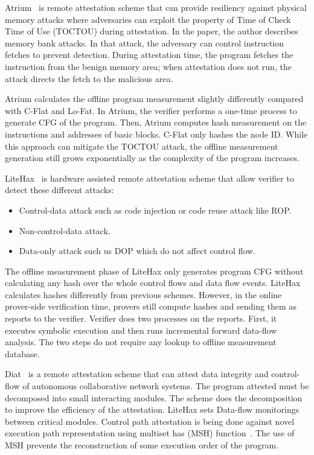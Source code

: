 Atrium~\cite{zeitouniATRIUMRuntimeAttestation2017} is remote attestation scheme
that can provide resiliency against physical memory attacks where adversaries
can exploit the property of Time of Check Time of Use (TOCTOU) during
attestation. In the paper, the author describes memory bank attacks. In that
attack, the adversary can control instruction fetches to prevent detection.
During attestation time, the program fetches the instruction from the benign
memory area; when attestation does not run, the attack directs the fetch to the
malicious area.

Atrium calculates the offline program measurement slightly differently compared
with C-Flat and Lo-Fat. In Atrium, the verifier performs a one-time process to
generate CFG of the program. Then, Atrium computes hash measurement on the
instructions and addresses of basic blocks. C-Flat only hashes the node ID.
While this approach can mitigate the TOCTOU attack, the offline measurement
generation still grows exponentially as the complexity of the program increases.

LiteHax~\cite{dessoukyLiteHAXLightweightHardwareassisted2018} is hardware
assisted remote attestation scheme that allow verifier to detect these different
attacks:

\begin{itemize}
    \item Control-data attack such as code injection or code reuse attack like
    ROP.
    \item Non-control-data attack.
    \item Data-only attack such us DOP which do not affect control flow.
\end{itemize}

The offline measurement phase of LiteHax only generates program CFG without
calculating any hash over the whole control flows and data flow events. LiteHax
calculates hashes differently from previous schemes. However, in the online
prover-side verification time, provers still compute hashes and sending them as
reports to the verifier. Verifier does two processes on the reports. First, it
executes symbolic execution and then runs incremental forward data-flow
analysis. The two steps do not require any lookup to offline measurement
database.

Diat~\cite{aberaDIATDataIntegrity2019} is a remote attestation scheme that can
attest data integrity and control-flow of autonomous collaborative network
systems. The program attested must be decomposed into small interacting modules.
The scheme does the decomposition to improve the efficiency of the attestation.
LiteHax sets Data-flow monitorings between critical modules. Control path
attestation is being done against novel execution path representation using
multiset has (MSH) function~\cite{clarkeIncrementalMultisetHash2003}. The use of
MSH prevents the reconstruction of some execution order of the program.

